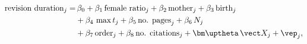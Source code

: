 \begin{equation}\label{equation13}
\begin{split}
	\text{revision duration}_j = 	&\, \beta_0+\beta_1\,\text{female ratio}_j +\beta_2\,\text{mother}_j + \beta_3\,\text{birth}_j \\
									& + \beta_4\,\max t_j + \beta_5\,\text{no. pages}_j + \beta_6\,N_j \\
									& + \beta_7\,\text{order}_j + \beta_8\,\text{no. citations}_j + \bm\uptheta\,\vect X_j + \vep_j,
\end{split}
\end{equation}